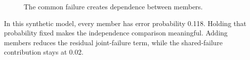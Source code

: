 \begin{figure}[H]
\centering
{}
\caption{The common failure creates dependence between members.}\label{fig:teach-M06-01}
\end{figure}

In this synthetic model, every member has error probability 0.118. Holding that probability fixed makes the independence comparison meaningful. Adding members reduces the residual joint-failure term, while the shared-failure contribution stays at 0.02.

